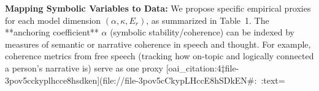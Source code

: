 \noindent\textbf{Mapping Symbolic Variables to Data:} We propose specific empirical proxies for each model dimension $(\alpha, \kappa, E_r)$, as summarized in Table~1. The **anchoring coefficient** $\alpha$ (symbolic stability/coherence) can be indexed by measures of semantic or narrative coherence in speech and thought. For example, coherence metrics from free speech (tracking how on-topic and logically connected a person's narrative is) serve as one proxy [oai_citation:4‡file-3pov5cckyplhcce8hsdken](file://file-3pov5cCkypLHccE8hSDkEN#:~:text=%

